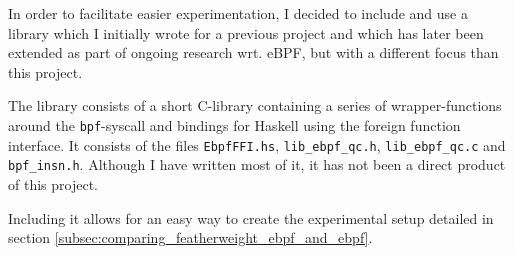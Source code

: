 In order to facilitate easier experimentation, I decided to include and use a library which I initially wrote for a previous project\cite{ebpf-fuzz} and which has later been extended as part of ongoing research wrt. eBPF, but with a different focus than this project.

The library consists of a short C-library containing a series of wrapper-functions around the \texttt{bpf}-syscall and bindings for Haskell using the foreign function interface.
It consists of the files \verb!EbpfFFI.hs!, \verb!lib_ebpf_qc.h!, \verb!lib_ebpf_qc.c! and \verb!bpf_insn.h!.
Although I have written most of it, it has not been a direct product of this project.

Including it allows for an easy way to create the experimental setup detailed in section \ref{subsec:comparing_featherweight_ebpf_and_ebpf}.







